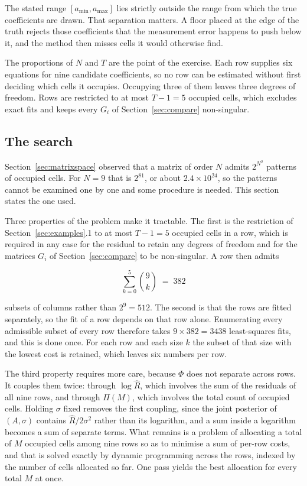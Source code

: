 The stated range $[a_{\min}, a_{\max}]$ lies strictly outside the range from which the
true coefficients are drawn. That separation matters. A floor placed at the edge of
the truth rejects those coefficients that the measurement error happens to push below
it, and the method then misses cells it would otherwise find.

The proportions of $N$ and $T$ are the point of the exercise. Each row supplies six
equations for nine candidate coefficients, so no row can be estimated without first
deciding which cells it occupies. Occupying three of them leaves three degrees of
freedom. Rows are restricted to at most $T-1 = 5$ occupied cells, which excludes exact
fits and keeps every $G_{i}$ of Section~\ref{sec:compare} non-singular.

\subsection{The search}

Section~\ref{sec:matrixspace} observed that a matrix of order $N$ admits $2^{N^{2}}$
patterns of occupied cells. For $N = 9$ that is $2^{81}$, or about
$2.4 \times 10^{24}$, so the patterns cannot be examined one by one and some
procedure is needed. This section states the one used.

Three properties of the problem make it tractable. The first is the restriction of
Section~\ref{sec:examples}.1 to at most $T-1 = 5$ occupied cells in a row, which is
required in any case for the residual to retain any degrees of freedom and for the
matrices $G_{i}$ of Section~\ref{sec:compare} to be non-singular. A row then admits

\begin{equation}
\sum_{k=0}^{5} \binom{9}{k} \;=\; 382
\label{eq:rowsubsets}
\end{equation}

subsets of columns rather than $2^{9} = 512$. The second is that the rows are fitted
separately, so the fit of a row depends on that row alone. Enumerating every
admissible subset of every row therefore takes $9 \times 382 = 3438$ least-squares
fits, and this is done once. For each row and each size $k$ the subset of that size
with the lowest cost is retained, which leaves six numbers per row.

The third property requires more care, because $\Phi$ does not separate across rows.
It couples them twice: through $\log \hat{R}$, which involves the sum of the residuals
of all nine rows, and through $\Pi(M)$, which involves the total count of occupied
cells. Holding $\sigma$ fixed removes the first coupling, since the joint posterior of
$(A,\sigma)$ contains $\hat{R}/2\sigma^{2}$ rather than its logarithm, and a sum
inside a logarithm becomes a sum of separate terms. What remains is a problem of
allocating a total of $M$ occupied cells among nine rows so as to minimise a sum of
per-row costs, and that is solved exactly by dynamic programming across the rows,
indexed by the number of cells allocated so far. One pass yields the best allocation
for every total $M$ at once.

